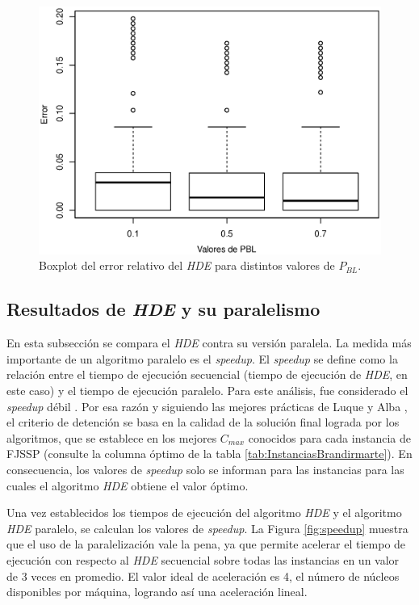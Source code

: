 \begin{figure}[H]
    \centering
    \includegraphics[trim={0 1cm 0 0.8cm},scale=0.6]{images/Boxplot-DELS.eps}
    \caption{Boxplot del error relativo del \textit{HDE} para distintos valores de $P_{BL}$.}
    \label{fig:DELSboxplot}
\end{figure}


\subsection{Resultados de \textit{HDE} y su paralelismo}

En esta subsección se compara el \textit{HDE} contra su versión paralela. La medida más importante de un algoritmo paralelo es el \textit{speedup}. El \textit{speedup} se define como la relación entre el tiempo de ejecución secuencial (tiempo de ejecución de \textit{HDE}, en este caso) y el tiempo de ejecución paralelo. Para este análisis, fue considerado el \textit{speedup} débil \cite{albaMeta2005}. Por esa razón y siguiendo las mejores prácticas de Luque y Alba \cite{LuqueAlba}, el criterio de detención se basa en la calidad de la solución final lograda por los algoritmos, que se establece en los mejores $C_{max}$ conocidos para cada instancia de FJSSP (consulte la columna óptimo de la tabla \ref{tab:InstanciasBrandirmarte}). En consecuencia, los valores de \textit{speedup} solo se informan para las instancias para las cuales el algoritmo \textit{HDE} obtiene el valor óptimo.

 
Una vez establecidos los tiempos de ejecución del algoritmo \textit{HDE} y el algoritmo \textit{HDE} paralelo, se calculan los valores de \textit{speedup}. La Figura \ref{fig:speedup} muestra que el uso de la paralelización vale la pena, ya que permite acelerar el tiempo de ejecución con respecto al \textit{HDE} secuencial sobre todas las instancias en un valor de 3 veces en promedio. El valor ideal de aceleración es 4, el número de núcleos disponibles por máquina, logrando así una aceleración lineal.


